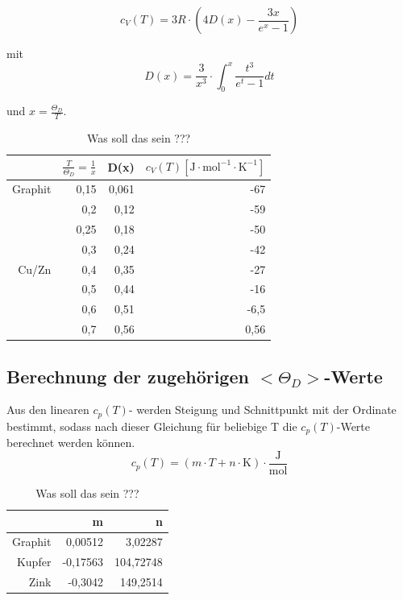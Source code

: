 \documentclass[12pt,a4paper,titlepage,headinclude,bibtotoc]{scrartcl}
\begin{document}
\begin{equation}
c_{V}(T)= 3R \cdot \left(4 D(x) - \frac{3x}{e^x -1}\right)
\end{equation}

mit \\

\begin{equation}
D(x) = \frac{3}{x^3}\cdot \int_{0}^{x} \frac{t^3}{e^t -1} dt
\end{equation}

und $x= \frac{\Theta_D}{T}$.

\begin{table} [h]
\centering
\caption{Was soll das sein ???}
\begin{tabular} {r | r|  r | r}
&$\frac{T}{\Theta_D}=\frac{1}{x}$& D(x)&$c_V(T)[\mathrm{J}\cdot \mathrm{mol}^{-1} \cdot \mathrm{K}^{-1}]$\\
\hline
Graphit&0,15&0,061&-67\\
&0,2&0,12&-59\\
&0,25&0,18&-50\\
&0,3&0,24&-42\\
\hline
Cu/Zn&0,4&0,35&-27\\
&0,5&0,44&-16\\
&0,6&0,51&-6,5\\
&0,7&0,56&0,56\\
\end{tabular}
\end{table}

\subsection{Berechnung der zugehörigen $<\Theta_D>$-Werte }
Aus den linearen $c_p(T)$- werden Steigung und Schnittpunkt mit der Ordinate bestimmt, sodass nach dieser Gleichung für beliebige T die $c_p(T)$-Werte berechnet werden können. \\

\begin{equation}
c_p(T) = \left( m\cdot T  + n \cdot \mathrm{K} \right) \cdot \frac{\mathrm{J}}{\mathrm{mol}}
\end{equation}
\begin{table} [h]
\centering
\caption{Was soll das sein ???}
\begin{tabular} {r | r|  r }
&m&n\\
\hline
Graphit& 0,00512&3,02287\\
Kupfer&-0,17563&104,72748\\
Zink&-0,3042&149,2514\\
\end{tabular}
\end{table}
\end{document}
